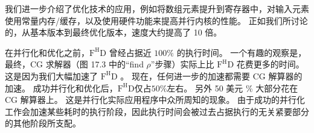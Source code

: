 我们进一步介绍了优化技术的应用，例如将数组元素提升到寄存器中，对输入元素使用常量内存/缓存，以及使用硬件功能来提高并行内核的性能。 正如我们所讨论的，从基本版本到最终优化版本，速度大约提高了 10 倍。

在并行化和优化之前，$\mathrm{F}^{\mathrm{H}} \mathrm{D}$ 曾经占据近 $100 \%$ 的执行时间。 一个有趣的观察是，最终，CG 求解器（图 17.3 中的“find $\rho$”步骤）实际上比 $\mathrm{F}^{\mathrm{H}} \mathrm{D}$ 花费更多的时间。 这是因为我们大幅加速了 $\mathrm{F}^{\mathrm{H}} \mathrm{D}$ 。 现在，任何进一步的加速都需要 CG 解算器的加速。 成功并行化和优化后，$\mathrm{F}^{\mathrm{H}} \mathrm{D}$仅占$50\%$左右。 另外 50 美元 \% 大部分花在 CG 解算器上。 这是并行化实际应用程序中众所周知的现象。 由于成功的并行化工作会加速某些耗时的执行阶段，因此执行时间会被过去占据执行的无关紧要部分的其他阶段所支配。